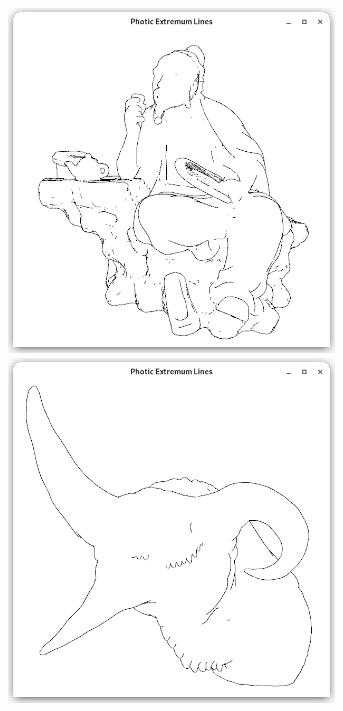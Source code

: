 \documentclass[9pt,fleqn,twoside,twocolumn]{stdglobal}
\begin{document}
\begin{figure}
\begin{subfigure}[t]{0.19\textwidth}
        \includegraphics[width=0.95\textwidth,trim={15px 15 15 50},clip]{images/results/luyu-contours.png}
        \includegraphics[width=0.95\textwidth,trim={15px 15 15 50},clip]{images/results/dragon-head-contours.png}

\end{subfigure}
\end{figure}
\end{document}
